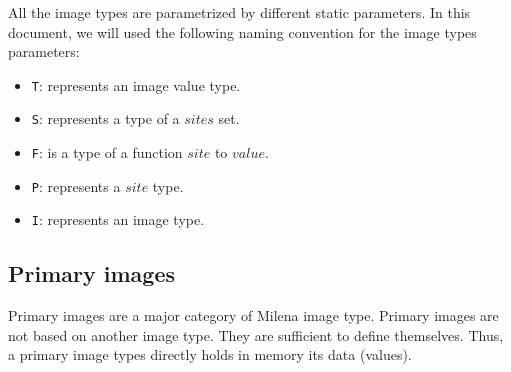 All the image types are parametrized by different static parameters.
In this document, we will used the following naming convention for the
image types parameters:
\begin{itemize}
\item{\verb+T+:} represents an image value type.
\item{\verb+S+:} represents a type of a $sites$ set.
\item{\verb+F+:} is a type of a function $site$ to $value$.
\item{\verb+P+:} represents a $site$ type.
\item{\verb+I+:} represents an image type.
\end{itemize}

\subsection{Primary images}


Primary images are a major category of Milena image type.
Primary images are not based on another image type.
They are sufficient to define themselves.
Thus, a primary image types directly holds in memory its data (values).


